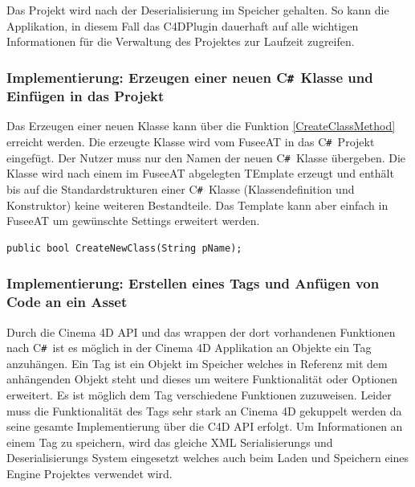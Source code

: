 \documentclass[pagesize, paper=a4, fontsize=12pt, titlepage=true, headings=small, headnosepline, abstractoff, liststotoc, nochapterprefix, plainheadsepline, twoside]{scrreprt}
\newcommand{\CSS}{C\texttt{\# }}
\begin{document}
Das Projekt wird nach der Deserialisierung im Speicher gehalten. So kann die Applikation, in diesem Fall das C4DPlugin dauerhaft auf alle wichtigen Informationen für die Verwaltung des Projektes zur Laufzeit zugreifen.

\subsubsection{Implementierung: Erzeugen einer neuen \CSS Klasse und Einfügen in das Projekt}
Das Erzeugen einer neuen Klasse kann über die Funktion \ref{CreateClassMethod} erreicht werden. Die erzeugte Klasse wird vom FuseeAT in das \CSS Projekt eingefügt. Der Nutzer muss nur den Namen der neuen \CSS Klasse übergeben. Die Klasse wird nach einem im FuseeAT abgelegten TEmplate erzeugt und enthält bis auf die Standardstrukturen einer \CSS Klasse (Klassendefinition und Konstruktor) keine weiteren Bestandteile. Das Template kann aber einfach in FuseeAT um gewünschte Settings erweitert werden.
\begin{lstlisting}[label=CreateClassMethod, caption=Funktion zum Erstellen einer neuen Klasse im \CSS Projekt.]
	public bool CreateNewClass(String pName);
\end{lstlisting}

\subsubsection{Implementierung: Erstellen eines Tags und Anfügen von Code an ein Asset}
Durch die Cinema 4D API und das wrappen der dort vorhandenen Funktionen nach \CSS ist es möglich in der Cinema 4D Applikation an Objekte ein Tag anzuhängen. Ein Tag ist ein Objekt im Speicher welches in Referenz mit dem anhängenden Objekt steht und dieses um weitere Funktionalität oder Optionen erweitert. Es ist möglich dem Tag verschiedene Funktionen zuzuweisen. Leider muss die Funktionalität des Tags sehr stark an Cinema 4D gekuppelt werden da seine gesamte Implementierung über die C4D API erfolgt.
Um Informationen an einem Tag zu speichern, wird das gleiche XML Serialisierungs und Deserialisierungs System eingesetzt welches auch beim Laden und Speichern eines Engine Projektes verwendet wird.
\end{document}
